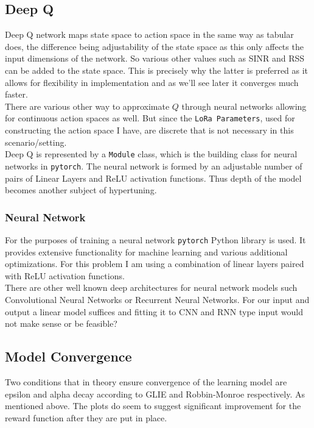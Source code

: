\subsection{Deep Q}
Deep Q network maps state space to action space in the same way
as tabular does, the difference being adjustability of the state
space as this only affects the input dimensions of the network.
So various other values such as SINR and RSS can be added to the 
state space. This is precisely why the latter is preferred 
as it allows for flexibility in implementation and as we'll 
see later it converges much faster. \\

There are various other way to approximate $Q$ through neural
networks allowing for continuous action spaces as well.
But since the \texttt{LoRa Parameters}, used for constructing
the action space I have, are discrete that is not necessary
in this scenario/setting.\\

Deep Q is represented by a \texttt{Module} class, which is 
the building class for neural networks in \texttt{pytorch}.
The neural network is formed by an adjustable number of 
pairs of Linear Layers and ReLU activation functions.
Thus depth of the model becomes another subject of 
hypertuning. \\



\subsubsection{Neural Network}

For the purposes of training a neural network \texttt{pytorch}
Python library is used. It provides extensive functionality
for machine learning and various additional optimizations.
For this problem I am using a combination of linear layers
paired with ReLU activation functions. \\

There are other well known deep architectures for neural
network models such Convolutional Neural Networks or 
Recurrent Neural Networks. For our input and output 
a linear model suffices and fitting it to CNN and RNN
type input would not make sense or be feasible?


\subsection{Model Convergence}
Two conditions that in theory ensure convergence of the 
learning model are epsilon and alpha decay according to 
GLIE and Robbin-Monroe respectively. As mentioned above.
The plots do seem to suggest significant improvement for the
reward function after they are put in place.\\

